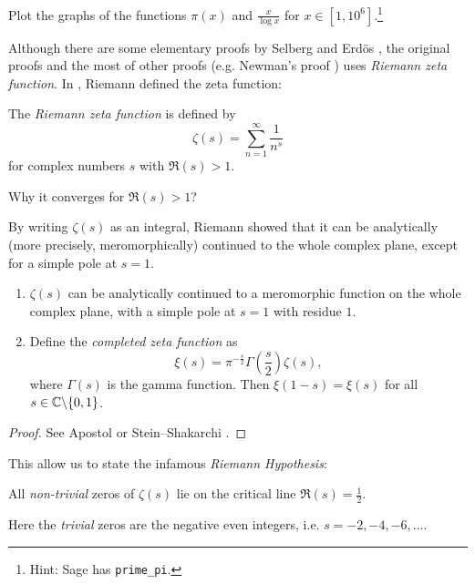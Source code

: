 \begin{exercise}\sage
    Plot the graphs of the functions $\pi(x)$ and $\frac{x}{\log x}$ for $x \in [1, 10^6]$.\footnote{Hint: Sage has \texttt{prime\_pi}.}
\end{exercise}


Although there are some elementary proofs by Selberg \cite{selberg1949elementary} and Erd\"os \cite{erdos1949new}, the original proofs and the most of other proofs (e.g. Newman's proof \cite{newman1980simple,zagier1997newman}) uses \emph{Riemann zeta function}.
In \cite{riemann1859ueber}, Riemann defined the zeta function:

\begin{definition}
    \label{def:riemann-zeta}
    The \emph{Riemann zeta function} is defined by
    \[
        \zeta(s) = \sum_{n=1}^\infty \frac{1}{n^s}
    \]
    for complex numbers $s$ with $\Re(s) > 1$.
\end{definition}
\begin{exercise}
    Why it converges for $\Re(s) > 1$?
\end{exercise}

By writing $\zeta(s)$ as an integral, Riemann showed that it can be analytically (more precisely, meromorphically) continued to the whole complex plane, except for a simple pole at $s = 1$.
\begin{theorem}
    \begin{enumerate}
        \item $\zeta(s)$ can be analytically continued to a meromorphic function on the whole complex plane, with a simple pole at $s = 1$ with residue $1$.
        \item Define the \emph{completed zeta function} as
        \begin{equation}
            \xi(s) = \pi^{-\frac{s}{2}} \Gamma\left(\frac{s}{2}\right) \zeta(s),
        \end{equation}
        where $\Gamma(s)$ is the gamma function.
        Then $\xi(1 - s) = \xi(s)$ for all $s \in \mathbb{C} \backslash \{0, 1\}$.
    \end{enumerate}
\end{theorem}
\begin{proof}
    See Apostol \cite{apostol2013introduction} or Stein--Shakarchi \cite{stein2010complex}.
\end{proof}
This allow us to state the infamous \emph{Riemann Hypothesis}:
\begin{conjecture}
    \label{conj:riemann-hypothesis}
    All \emph{non-trivial} zeros of $\zeta(s)$ lie on the critical line $\Re(s) = \frac{1}{2}$.
\end{conjecture}
Here the \emph{trivial} zeros are the negative even integers, i.e. $s = -2, -4, -6, \dots$.


